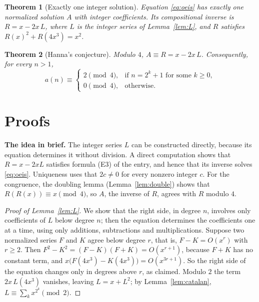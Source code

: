 \documentclass[11pt,a4paper]{article}
\newtheorem{theorem}{Theorem}[section]
\theoremstyle{definition}
\theoremstyle{remark}
\newcommand{\para}[1]{\par\medskip\noindent\textbf{#1}\enspace}
\begin{document}
\begin{theorem}[Exactly one integer solution]\label{thm:exist}
Equation \eqref{eq:oeis} has exactly one normalized solution $A$ with integer coefficients. Its compositional inverse is
$R=x-2x\,L$, where $L$ is the integer series of Lemma~\ref{lem:L}, and $R$ satisfies $R(x)^2+R(4x^3)=x^2$.
\end{theorem}

\begin{theorem}[Hanna's conjecture]\label{thm:main}
Modulo $4$, $A\equiv R=x-2x\,L$. Consequently, for every $n>1$,
\[
a(n)\equiv\begin{cases}2\pmod4,&\text{if }n=2^k+1\text{ for some }k\ge0,\\[2pt]0\pmod4,&\text{otherwise.}\end{cases}
\]
\end{theorem}

\section{Proofs}\label{sec:proofs}

\para{The idea in brief.} The integer series $L$ can be constructed directly, because its equation determines it
without division. A direct computation shows that $R=x-2xL$ satisfies formula (E3) of the entry, and hence that its inverse solves
\eqref{eq:oeis}. Uniqueness uses that $2c\ne0$ for every nonzero integer $c$. For the congruence, the doubling lemma
(Lemma~\ref{lem:double}) shows that $R(R(x))\equiv x\pmod 4$, so $A$, the inverse of $R$, agrees with $R$ modulo $4$.

\begin{proof}[Proof of Lemma~\ref{lem:L}]
We show that the right side, in degree $n$, involves only coefficients of $L$ below degree $n$; then the equation
determines the coefficients one at a time, using only additions, subtractions and multiplications. Suppose two normalized
series $F$ and $K$ agree below degree $r$, that is, $F-K=O(x^r)$ with $r\ge2$. Then $F^2-K^2=(F-K)(F+K)=O(x^{r+1})$,
because $F+K$ has no constant term, and $x\bigl(F(4x^3)-K(4x^3)\bigr)=O(x^{3r+1})$. So the right side of the equation
changes only in degrees above $r$, as claimed. Modulo $2$ the term $2x\,L(4x^3)$ vanishes, leaving $L=x+L^2$; by
Lemma~\ref{lem:catalan}, $L\equiv\sum_kx^{2^k}\pmod 2$.
\end{proof}
\end{document}
